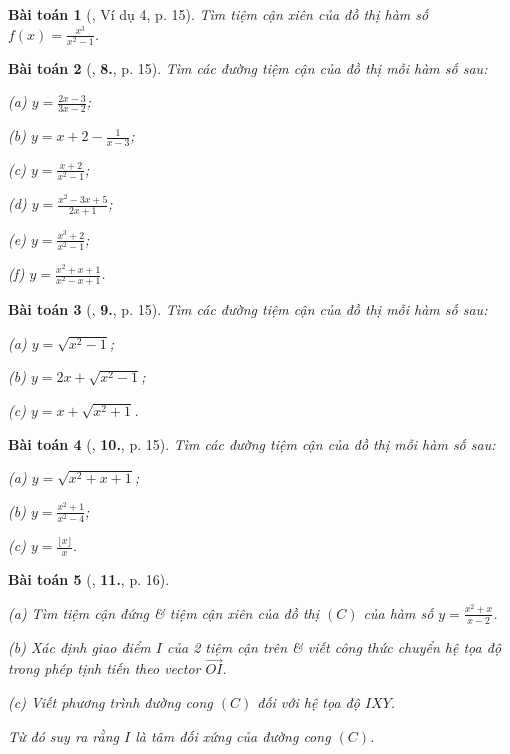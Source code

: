 \documentclass[12pt]{article}
\numberwithin{equation}{section}
\newtheorem{baitoan}{Bài toán}[section]
\begin{document}
\begin{baitoan}[\cite{TL_chuyen_Toan_Giai_Tich_12}, Ví dụ 4, p. 15]
	Tìm tiệm cận xiên của đồ thị hàm số $f(x) = \frac{x^3}{x^2 - 1}$.
\end{baitoan}

\begin{baitoan}[\cite{TL_chuyen_Toan_Giai_Tich_12}, \textbf{8.}, p. 15]
	Tìm các đường tiệm cận của đồ thị mỗi hàm số sau:
	\begin{enumerate*}
		\item[(a)] $y = \frac{2x - 3}{3x - 2}$;
		\item[(b)] $y = x + 2 - \frac{1}{x - 3}$;
		\item[(c)] $y = \frac{x + 2}{x^2 - 1}$;
		\item[(d)] $y = \frac{x^2 - 3x + 5}{2x + 1}$;
		\item[(e)] $y = \frac{x^3 + 2}{x^2 - 1}$;
		\item[(f)] $y = \frac{x^2 + x + 1}{x^2 - x + 1}$.
	\end{enumerate*}
\end{baitoan}

\begin{baitoan}[\cite{TL_chuyen_Toan_Giai_Tich_12}, \textbf{9.}, p. 15]
	Tìm các đường tiệm cận của đồ thị mỗi hàm số sau:
	\begin{enumerate*}
		\item[(a)] $y = \sqrt{x^2 - 1}$;
		\item[(b)] $y = 2x + \sqrt{x^2 - 1}$;
		\item[(c)] $y = x + \sqrt{x^2 + 1}$.
	\end{enumerate*}
\end{baitoan}

\begin{baitoan}[\cite{TL_chuyen_Toan_Giai_Tich_12}, \textbf{10.}, p. 15]
	Tìm các đường tiệm cận của đồ thị mỗi hàm số sau:
	\begin{enumerate*}
		\item[(a)] $y = \sqrt{x^2 + x + 1}$;
		\item[(b)] $y = \frac{x^2 + 1}{x^2 - 4}$;
		\item[(c)] $y = \frac{\lfloor x\rfloor}{x}$.
	\end{enumerate*}
\end{baitoan}

\begin{baitoan}[\cite{TL_chuyen_Toan_Giai_Tich_12}, \textbf{11.}, p. 16]
	\begin{enumerate*}
		\item[(a)] Tìm tiệm cận đứng \& tiệm cận xiên của đồ thị $(C)$ của hàm số $y = \frac{x^2 + x}{x - 2}$.
		\item[(b)] Xác định giao điểm $I$ của 2 tiệm cận trên \& viết công thức chuyển hệ tọa độ trong phép tịnh tiến theo vector $\overrightarrow{OI}$.
		\item[(c)] Viết phương trình đường cong $(C)$ đối với hệ tọa độ $IXY$.
	\end{enumerate*}
	Từ đó suy ra rằng $I$ là tâm đối xứng của đường cong $(C)$.
\end{baitoan}
\end{document}
